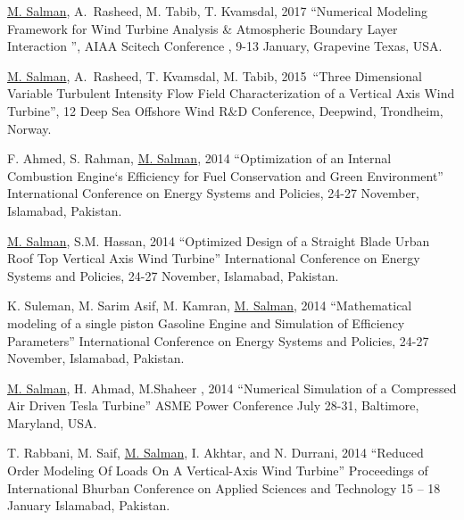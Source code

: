 

\begin{cventries}

  \cventry
    {} %
    {} %
    {} %
    {} %
    {
    	\begin{cvitems} %
    		\item{\underline{M. Salman}, A. Rasheed, M. Tabib, T.  Kvamsdal, 2017 “Numerical Modeling Framework for Wind Turbine Analysis \& Atmospheric Boundary Layer Interaction  ”, AIAA Scitech Conference , 9-13 January, Grapevine Texas, USA.}
        \item {\underline{M. Salman}, A. Rasheed, T.  Kvamsdal, M. Tabib, 2015 “Three Dimensional Variable Turbulent Intensity Flow Field Characterization of a Vertical Axis Wind Turbine”, 12 Deep Sea Offshore Wind R$\&$D Conference, Deepwind, Trondheim, Norway.}
        \item {F. Ahmed, S. Rahman, \underline{M. Salman}, 2014 “Optimization of an Internal Combustion Engine`s Efficiency for Fuel Conservation and Green Environment” International Conference on Energy Systems and Policies, 24-27 November, Islamabad, Pakistan.}
         \item {\underline{M. Salman}, S.M. Hassan, 2014 “Optimized Design of a Straight Blade Urban Roof Top Vertical Axis Wind Turbine” International Conference on Energy Systems and Policies, 24-27 November, Islamabad, Pakistan.}
         \item{K. Suleman, M. Sarim Asif, M. Kamran, \underline{M. Salman}, 2014 “Mathematical modeling of a single piston Gasoline Engine and Simulation of Efficiency Parameters” International Conference on Energy Systems and Policies, 24-27 November, Islamabad, Pakistan.}
         \item{\underline{M. Salman}, H. Ahmad, M.Shaheer , 2014 “Numerical Simulation of a Compressed Air Driven Tesla Turbine” ASME Power Conference July 28-31, Baltimore, Maryland, USA.}
         \item{T. Rabbani, M. Saif, \underline{M. Salman}, I. Akhtar, and N. Durrani, 2014 “Reduced Order Modeling Of Loads On A Vertical-Axis Wind Turbine” Proceedings of International Bhurban Conference on Applied Sciences and Technology 15 – 18 January Islamabad, Pakistan.}

\end{cvitems}}
\end{cventries}
